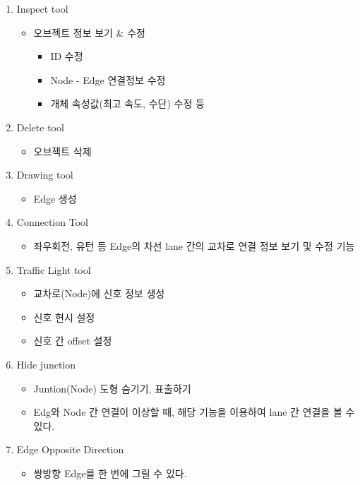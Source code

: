 \documentclass[
  letterpaper,
  DIV=11,
  numbers=noendperiod]{scrreprt}
\providecommand{\tightlist}{%
  \setlength{\itemsep}{0pt}\setlength{\parskip}{0pt}}
\begin{document}
\begin{enumerate}
\def\labelenumi{\arabic{enumi}.}
\tightlist
\item
  Inspect tool

  \begin{itemize}
  \tightlist
  \item
    오브젝트 정보 보기 \& 수정

    \begin{itemize}
    \tightlist
    \item
      ID 수정
    \item
      Node - Edge 연결정보 수정
    \item
      개체 속성값(최고 속도, 수단) 수정 등\\
    \end{itemize}
  \end{itemize}
\item
  Delete tool

  \begin{itemize}
  \tightlist
  \item
    오브젝트 삭제
  \end{itemize}
\item
  Drawing tool

  \begin{itemize}
  \tightlist
  \item
    Edge 생성
  \end{itemize}
\item
  Connection Tool

  \begin{itemize}
  \tightlist
  \item
    좌우회전, 유턴 등 Edge의 차선 lane 간의 교차로 연결 정보 보기 및
    수정 기능
  \end{itemize}
\item
  Traffic Light tool

  \begin{itemize}
  \tightlist
  \item
    교차로(Node)에 신호 정보 생성
  \item
    신호 현시 설정
  \item
    신호 간 offset 설정
  \end{itemize}
\item
  Hide junction

  \begin{itemize}
  \tightlist
  \item
    Juntion(Node) 도형 숨기기, 표출하기
  \item
    Edg와 Node 간 연결이 이상할 때, 해당 기능을 이용하여 lane 간 연결을
    볼 수 있다.
  \end{itemize}
\item
  Edge Opposite Direction

  \begin{itemize}
  \tightlist
  \item
    쌍방향 Edge를 한 번에 그릴 수 있다.
  \end{itemize}
\end{enumerate}
\end{document}
